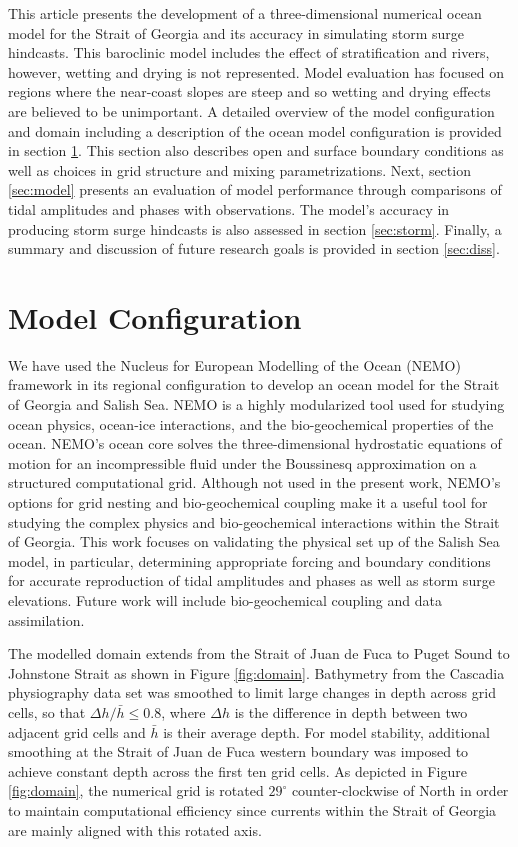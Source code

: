 \documentclass[pdftex,10pt]{article}
\begin{document}
This article presents the development of a three-dimensional numerical ocean model for the Strait of Georgia and its accuracy in simulating storm surge hindcasts. This baroclinic model includes the effect of stratification and rivers, however, wetting and drying is not represented. Model evaluation has focused on regions where the near-coast slopes are steep and so wetting and drying effects are believed to be unimportant. A detailed overview of the model configuration and domain including a description of the ocean model configuration is provided in section \ref{sec:config}. This section also describes open and surface boundary conditions as well as choices in grid structure and mixing parametrizations. Next, section \ref{sec:model} presents an evaluation of model performance through comparisons of tidal amplitudes and phases with observations. The model's accuracy in producing storm surge hindcasts is also assessed in section \ref{sec:storm}. Finally, a summary and discussion of future research goals is provided in section \ref{sec:diss}.  

\section{Model Configuration}\label{sec:config}

We have used the Nucleus for European Modelling of the Ocean (NEMO) framework in its regional configuration \citep{madec2012nemo} to develop an ocean model for the Strait of Georgia and Salish Sea. NEMO is a highly modularized tool used for studying ocean physics, ocean-ice interactions, and the bio-geochemical properties of the ocean. NEMO's ocean core solves the three-dimensional hydrostatic equations of motion for an incompressible fluid under the Boussinesq approximation on a structured computational grid. Although not used in the present work, NEMO's options for grid nesting and bio-geochemical coupling make it a useful tool for studying the complex physics and bio-geochemical interactions within the Strait of Georgia. This work focuses on validating the physical set up of the Salish Sea model, in particular, determining appropriate forcing and boundary conditions for accurate reproduction of tidal amplitudes and phases as well as storm surge elevations. Future work will include bio-geochemical coupling and data assimilation. 

The modelled domain extends from the Strait of Juan de Fuca to Puget Sound to Johnstone Strait as shown in Figure \ref{fig:domain}. Bathymetry from the Cascadia physiography data set \citep{haugerud1999digital} was smoothed to limit large changes in depth across grid cells, so that $\Delta h/\bar{h} \leq 0.8$, where $\Delta h$ is the difference in depth between two adjacent grid cells and $\bar{h}$ is their average depth. For model stability, additional smoothing at the Strait of Juan de Fuca western boundary was imposed to achieve constant depth across the first ten grid cells. As depicted in Figure \ref{fig:domain}, the numerical grid is rotated $29^{\circ}$ counter-clockwise of North in order to maintain computational efficiency since currents within the Strait of Georgia are mainly aligned with this rotated axis. 
\end{document}
